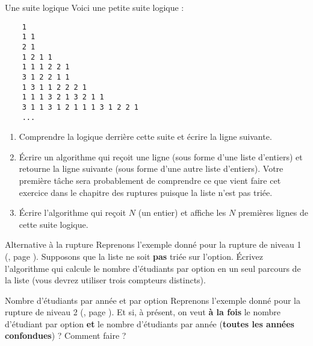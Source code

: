 \begin{Exercice}{Une suite logique}
	Voici une petite suite logique :
	
	\begin{minipage}{5cm}
		\small
		\begin{verbatim}
	1
	1 1
	2 1
	1 2 1 1
	1 1 1 2 2 1
	3 1 2 2 1 1
	1 3 1 1 2 2 2 1
	1 1 1 3 2 1 3 2 1 1
	3 1 1 3 1 2 1 1 1 3 1 2 2 1
	...
		\end{verbatim}
	\end{minipage}
	\begin{minipage}{9cm}
		\begin{enumerate}[label=\alph*)]
		\item
			Comprendre la logique derrière cette suite 
			et écrire la ligne suivante.
		\item
			Écrire un algorithme qui reçoit une ligne 
			(sous forme d'une liste d'entiers) 
			et retourne la ligne suivante 
			(sous forme d'une autre liste d'entiers).
			Votre première tâche sera probablement de comprendre 
			ce que vient faire cet exercice dans le chapitre des ruptures puisque la liste n'est pas triée.
		\item
			Écrire l'algorithme qui reçoit $N$ (un entier) 
			et affiche les $N$ premières lignes de cette suite logique.	
		\end{enumerate}
	\end{minipage}
\end{Exercice}

\begin{Exercice}{Alternative à la rupture}
	Reprenons l'exemple donné pour la rupture de niveau 1 (, page \pageref{algo:rupt1}).
	Supposons que la liste ne soit \textbf{pas} triée sur l'option.
	Écrivez l'algorithme qui calcule le nombre d'étudiants par option en un seul parcours de la liste
	(vous devrez utiliser trois compteurs distincts).
\end{Exercice}

\begin{Exercice}{Nombre d'étudiants par année et par option}
	Reprenons l'exemple donné pour la rupture de niveau 2 (, 
	page \pageref{algo:rupt2}). 
	Et si, à présent,
	on veut \textbf{à la fois} le nombre d'étudiant par option 
	\textbf{et} le nombre d'étudiants par année 
	(\textbf{toutes les années confondues}) ?
	Comment faire ?
\end{Exercice}
